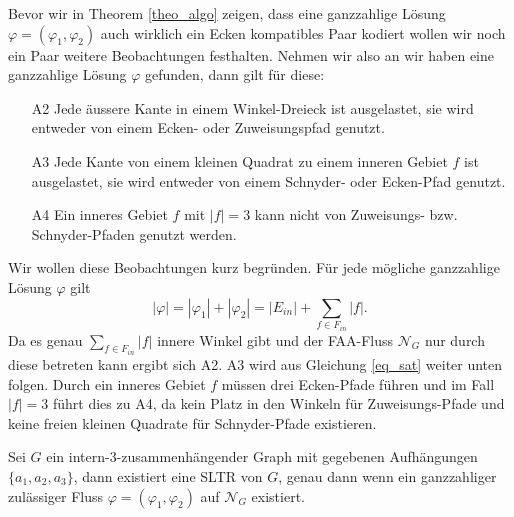 Bevor wir in Theorem \ref{theo_algo} zeigen, dass eine ganzzahlige Lösung $\varphi=(\varphi_1,\varphi_2)$ auch wirklich ein Ecken kompatibles Paar kodiert wollen wir noch ein Paar weitere Beobachtungen festhalten. Nehmen wir also an wir haben eine ganzzahlige Lösung $\varphi$ gefunden, dann gilt für diese:
\begin{itemize}
\item [A2] Jede äussere Kante in einem Winkel-Dreieck ist ausgelastet, sie wird entweder von einem Ecken- oder Zuweisungspfad genutzt.
\item [A3] Jede Kante von einem kleinen Quadrat zu einem inneren Gebiet $f$ ist ausgelastet, sie wird entweder von einem Schnyder- oder Ecken-Pfad genutzt.
\item [A4] Ein inneres Gebiet $f$ mit $|f|=3$ kann nicht von Zuweisungs- bzw. Schnyder-Pfaden genutzt werden.
\end{itemize}

Wir wollen diese Beobachtungen kurz begründen. Für jede mögliche ganzzahlige Lösung $\varphi$ gilt $$|\varphi|=|\varphi_1|+|\varphi_2| = |E_{in}| + \sum_{f \in F_{in}} |f|.$$
Da es genau $\sum_{f \in F_{in}} |f|$ innere Winkel gibt und der FAA-Fluss $\mathcal{N}_G$ nur durch diese betreten kann ergibt sich A2. A3 wird aus Gleichung \ref{eq_sat} weiter unten folgen. Durch ein inneres Gebiet $f$ müssen drei Ecken-Pfade führen und im Fall $|f|=3$ führt dies zu A4, da kein Platz in den Winkeln für Zuweisungs-Pfade und keine freien kleinen Quadrate für Schnyder-Pfade existieren.

\begin{theorem}\label{theo_algo}
Sei $G$ ein intern-3-zusammenhängender Graph mit gegebenen Aufhängungen $\{a_1,a_2,a_3\}$, dann existiert eine SLTR von $G$, genau dann wenn ein ganzzahliger zulässiger Fluss $\varphi=(\varphi_1,\varphi_2)$ auf $\mathcal{N}_G$ existiert.
\end{theorem}

